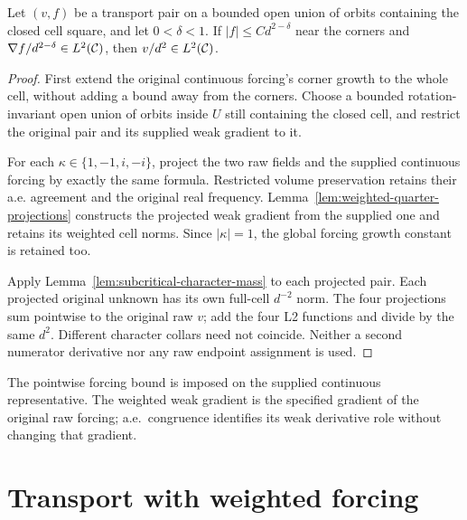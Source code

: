 \begin{lemma}
\label{lem:transport-second-gain}
\leanok
Let $(v,f)$ be a transport pair on a bounded open union of orbits containing
the closed cell square, and let $0<\delta<1$. If
$|f|\le Cd^{2-\delta}$ near the corners and
$\nabla f/d^{2-\delta}\in L^2(\mathcal{C})$, then
$v/d^2\in L^2(\mathcal{C})$.
\end{lemma}

\begin{proof}
\leanok
First extend the original continuous forcing's corner growth to the whole
cell, without adding a bound away from the corners.
Choose a bounded rotation-invariant open union of orbits inside $U$ still
containing the closed cell, and restrict the original pair and its supplied
weak gradient to it.

For each $\kappa\in\{1,-1,i,-i\}$, project the two raw fields and the
supplied continuous forcing by exactly the same formula.
Restricted volume preservation retains their a.e. agreement and the original
real frequency. Lemma~\ref{lem:weighted-quarter-projections} constructs the
projected weak gradient from the supplied one and retains its weighted cell
norms. Since $|\kappa|=1$, the global forcing growth constant is retained too.

Apply Lemma~\ref{lem:subcritical-character-mass} to each projected pair.
Each projected original unknown has its own full-cell $d^{-2}$ norm.
The four projections sum pointwise to the original raw $v$; add the four
L2 functions and divide by the same $d^2$.
Different character collars need not coincide.
Neither a second numerator derivative nor any raw endpoint assignment is used.
\end{proof}

\begin{remark}
The pointwise forcing bound is imposed on the supplied continuous representative.
The weighted weak gradient is the specified gradient of the original raw forcing;
a.e.\ congruence identifies its weak derivative role without changing that gradient.
\end{remark}

\section{Transport with weighted forcing}

